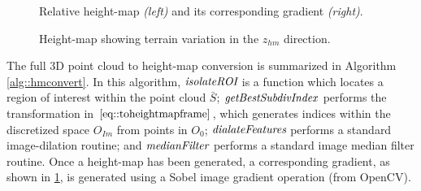 				\begin{figure}[t!]
					\centering
					\caption{Relative height-map \emph{(left)} and its corresponding gradient \emph{(right)}.}
					\label{fig::heightmap_terrain_patch}
				\end{figure}
				\begin{figure}[h!]
					\centering
					\caption{Height-map showing terrain variation in the $z_{hm}$ direction.}
					\label{fig::heightmap_terrain_patch_ortho}
				\end{figure}							
			The full 3D point cloud to height-map conversion is summarized in Algorithm \ref{alg::hmconvert}. In this algorithm, $\emph{\text{isolateROI}}$ is a function which locates a region of interest within the point cloud $\bar{S}$; $\emph{\text{getBestSubdivIndex}}$ performs the transformation in $\ref{eq::toheightmapframe}$, which generates indices within the discretized space $O_{Im}$ from points in $O_{0}$; $\emph{\text{dialateFeatures}}$ performs a standard image-dilation routine; and $\emph{\text{medianFilter}}$ performs a standard image median filter routine. Once a height-map has been generated, a corresponding gradient, as shown in \ref{fig::heightmap_terrain_patch}, is generated using a Sobel image gradient operation (from OpenCV).
